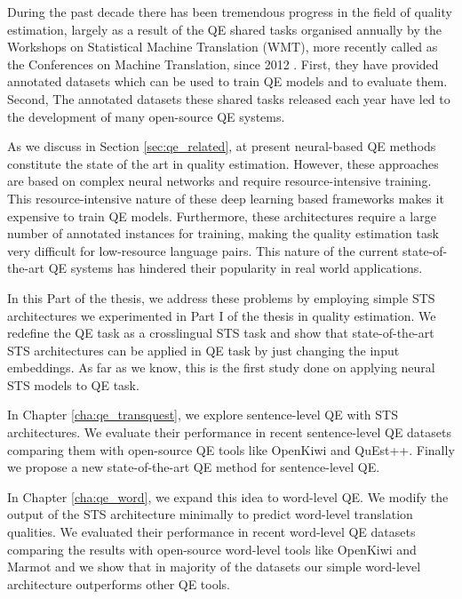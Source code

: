 During the past decade there has been tremendous progress in the field of quality estimation, largely as a result of the QE shared tasks organised annually by the Workshops on Statistical Machine Translation (WMT), more recently called as the Conferences on Machine Translation, since 2012  \autocite{callison-burch-etal-2012-findings,bojar-etal-2013-findings,bojar-etal-2014-findings,bojar-etal-2015-findings,bojar-etal-2016-findings,bojar-etal-2017-findings,specia-etal-2018-findings,fonseca-etal-2019-findings,specia-etal-2020-findings-wmt}. First, they have provided annotated datasets which can be used to train QE models and to evaluate them. Second, The annotated datasets these shared tasks released each year have led to the development of many open-source QE systems. 

As we discuss in Section \ref{sec:qe_related}, at present neural-based QE methods constitute the state of the art in quality estimation. However, these approaches are based on complex neural networks and require resource-intensive training. This resource-intensive nature of these deep learning based frameworks makes it expensive to train QE models. Furthermore, these architectures require a large number of annotated instances for training, making the quality estimation task very difficult for low-resource language pairs. This nature of the current state-of-the-art QE systems has hindered their popularity in real world applications.

In this Part of the thesis, we address these problems by employing simple STS architectures we experimented in Part I of the thesis in quality estimation. We redefine the QE task as a crosslingual STS task and show that state-of-the-art STS architectures can be applied in QE task by just changing the input embeddings. As far as we know, this is the first study done on applying neural STS models to QE task. 

In Chapter \ref{cha:qe_transquest}, we explore sentence-level QE with STS architectures. We evaluate their performance in recent sentence-level QE datasets comparing them with open-source QE tools like OpenKiwi and QuEst++. Finally we propose a new state-of-the-art QE method for sentence-level QE.

In Chapter \ref{cha:qe_word}, we expand this idea to word-level QE. We modify the output of the STS architecture minimally to predict word-level translation qualities. We evaluated their performance in recent word-level QE datasets comparing the results with open-source word-level tools like OpenKiwi and Marmot and we show that in majority of the datasets our simple word-level architecture outperforms other QE tools. 

